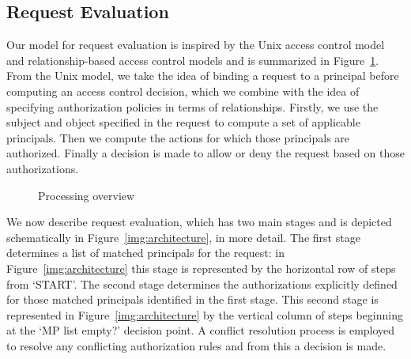 \documentclass{article}
\begin{document}
\subsection{Request Evaluation}\label{sec:AuthZModel:ReqEval}

Our model for request evaluation is inspired by the Unix access control model and relationship-based access control models and is summarized in Figure~\ref{img:overview}.
From the Unix model, we take the idea of binding a request to a principal before computing an access control decision, which we combine with the idea of specifying authorization policies in terms of relationships.
Firstly, we use the subject and object specified in the request to compute a set of applicable principals.
Then we compute the actions for which those principals are authorized.
Finally a decision is made to allow or deny the request based on those authorizations.


\begin{figure}[!ht]\centering
    \caption{Processing overview}\label{img:overview}
\end{figure}

We now describe request evaluation, which has two main stages and is depicted schematically in Figure~\ref{img:architecture}, in more detail.
The first stage determines a list of matched principals for the request: in Figure~\ref{img:architecture} this stage is represented by the horizontal row of steps from `START'.
The second stage determines the authorizations explicitly defined for those matched principals identified in the first stage.
This second stage is represented in Figure~\ref{img:architecture} by the vertical column of steps beginning at the `MP list empty?' decision point.
A conflict resolution process is employed to resolve any conflicting authorization rules and from this a decision is made.
\end{document}
